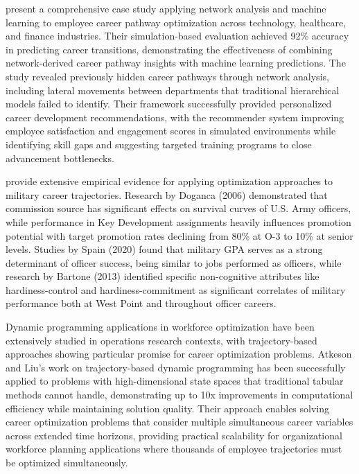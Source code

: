 \documentclass[main.tex]{subfiles}
\begin{document}
\textcite{career_optimization} present a comprehensive case study applying network analysis and machine learning to employee career pathway optimization across technology, healthcare, and finance industries. Their simulation-based evaluation achieved 92\% accuracy in predicting career transitions, demonstrating the effectiveness of combining network-derived career pathway insights with machine learning predictions. The study revealed previously hidden career pathways through network analysis, including lateral movements between departments that traditional hierarchical models failed to identify. Their framework successfully provided personalized career development recommendations, with the recommender system improving employee satisfaction and engagement scores in simulated environments while identifying skill gaps and suggesting targeted training programs to close advancement bottlenecks.

\textcite{army_indicators} provide extensive empirical evidence for applying optimization approaches to military career trajectories. Research by Doganca (2006) demonstrated that commission source has significant effects on survival curves of U.S. Army officers, while performance in Key Development assignments heavily influences promotion potential with target promotion rates declining from 80\% at O-3 to 10\% at senior levels. Studies by Spain (2020) found that military GPA serves as a strong determinant of officer success, being similar to jobs performed as officers, while research by Bartone (2013) identified specific non-cognitive attributes like hardiness-control and hardiness-commitment as significant correlates of military performance both at West Point and throughout officer careers.

Dynamic programming applications in workforce optimization have been extensively studied in operations research contexts, with trajectory-based approaches showing particular promise for career optimization problems\parencite{trajectory_dp}. Atkeson and Liu's work on trajectory-based dynamic programming has been successfully applied to problems with high-dimensional state spaces that traditional tabular methods cannot handle, demonstrating up to 10x improvements in computational efficiency while maintaining solution quality. Their approach enables solving career optimization problems that consider multiple simultaneous career variables across extended time horizons, providing practical scalability for organizational workforce planning applications where thousands of employee trajectories must be optimized simultaneously.
\end{document}
